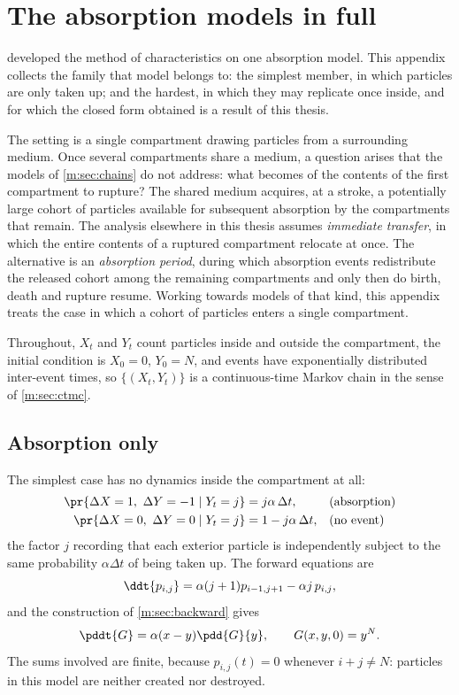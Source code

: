 \section{The absorption models in full}
\label{m:app:absorption}

 developed the method of characteristics on one absorption model.
This appendix collects the family that model belongs to: the simplest member, in
which particles are only taken up; and the hardest, in which they may replicate
once inside, and for which the closed form obtained is a result of this thesis.

The setting is a single compartment drawing particles from a surrounding medium.
Once several compartments share a medium, a question arises that the models of
\cref{m:sec:chains} do not address: what becomes of the contents of the first
compartment to rupture? The shared medium acquires, at a stroke, a potentially
large cohort of particles available for subsequent absorption by the compartments
that remain. The analysis elsewhere in this thesis assumes \emph{immediate
transfer}, in which the entire contents of a ruptured compartment relocate at once.
The alternative is an \emph{absorption period}, during which absorption events
redistribute the released cohort among the remaining compartments and only then do
birth, death and rupture resume. Working towards models of that kind, this appendix
treats the case in which a cohort of particles enters a single compartment.

Throughout, $X_t$ and $Y_t$ count particles inside and outside the compartment, the
initial condition is $X_0=0$, $Y_0=N$, and events have exponentially distributed
inter-event times, so $\{(X_t,Y_t)\}$ is a continuous-time Markov chain in the sense
of \cref{m:sec:ctmc}.

\subsection{Absorption only}
\label{m:app:absonly}

The simplest case has no dynamics inside the compartment at all:
\begin{align*}
\pr{\Delta X=1,\ \Delta Y=-1\mid Y_t=j} &= j\alpha\,\Delta t, &&\text{(absorption)}\\
\pr{\Delta X=0,\ \Delta Y=0\mid Y_t=j} &= 1-j\alpha\,\Delta t, &&\text{(no event)}
\end{align*}
the factor $j$ recording that each exterior particle is independently subject to
the same probability $\alpha\Delta t$ of being taken up. The forward equations are
\begin{equation}
\label{m:eq:FK1}
\ddt{p_{i,j}} = \alpha(j+1)p_{i-1,j+1} - \alpha j\,p_{i,j},
\end{equation}
and the construction of \cref{m:sec:backward} gives
\begin{equation}
\label{m:eq:PDE1}
\pddt{G} = \alpha(x-y)\pdd{G}{y},
\qquad
G(x,y,0) = y^N .
\end{equation}
The sums involved are finite, because $p_{i,j}(t)=0$ whenever $i+j\neq N$: particles
in this model are neither created nor destroyed.

